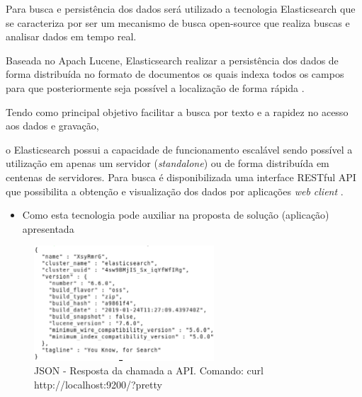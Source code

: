 Para busca e persistência dos dados será utilizado a tecnologia Elasticsearch que se caracteriza por ser um mecanismo de busca open-source que realiza buscas e analisar dados em tempo real.

Baseada no Apach Lucene, Elasticsearch realizar a persistência dos dados de forma distribuída no formato de documentos os quais indexa todos os campos para que posteriormente seja possível a localização de forma rápida \cite{Gormley:2015}.

Tendo como principal objetivo facilitar a busca por texto e a rapidez no acesso aos dados e gravação, 

o Elasticsearch possui a capacidade de funcionamento escalável sendo possível a utilização em apenas um servidor (\textit{standalone}) ou de forma distribuída em centenas de servidores.
Para busca é disponibilizada uma interface RESTful API que possibilita a obtenção e visualização dos dados por aplicações \textit{web client} \cite{Gormley:2015}.

\begin{itemize}
	\item Como esta tecnologia pode auxiliar na proposta de solução (aplicação) apresentada
\end{itemize}
\begin{figure}[!htb]
	\caption{\label{fig_grafico}JSON - Resposta da chamada a API. Comando: curl http://localhost:9200/?pretty}
	\begin{center}
		\includegraphics[width=0.6\textwidth]{imagens/pretty.eps}
	\end{center}
\end{figure}
